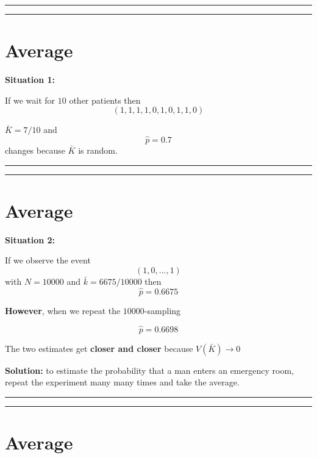 \documentclass[
]{book}
\begin{document}
\begin{center}\rule{0.5\linewidth}{0.5pt}\end{center}

\begin{center}\rule{0.5\linewidth}{0.5pt}\end{center}

\hypertarget{average-4}{%
\section{Average}\label{average-4}}

\textbf{Situation 1:}

If we wait for \(10\) other patients then \[(1, 1, 1, 1, 0, 1, 0, 1, 1, 0)\]

\(\bar{K}=7/10\) and \[\hat{p}=0.7\] changes because \(\bar{K}\) is random.

\begin{center}\rule{0.5\linewidth}{0.5pt}\end{center}

\begin{center}\rule{0.5\linewidth}{0.5pt}\end{center}

\hypertarget{average-5}{%
\section{Average}\label{average-5}}

\textbf{Situation 2:}

If we observe the event \[(1, 0, ..., 1)\]
with \(N=10000\) and \(\bar{k}= 6675/10000\) then \[\hat{p}= 0.6675\]

\textbf{However}, when we repeat the \(10000\)-sampling

\[\hat{p}=0.6698\]

The two estimates get \textbf{closer and closer} because \(V(\bar{K}) \rightarrow 0\)

\textbf{Solution:} to estimate the probability that a man enters an emergency room, repeat the experiment many many times and take the average.

\begin{center}\rule{0.5\linewidth}{0.5pt}\end{center}

\begin{center}\rule{0.5\linewidth}{0.5pt}\end{center}

\hypertarget{average-6}{%
\section{Average}\label{average-6}}
\end{document}
